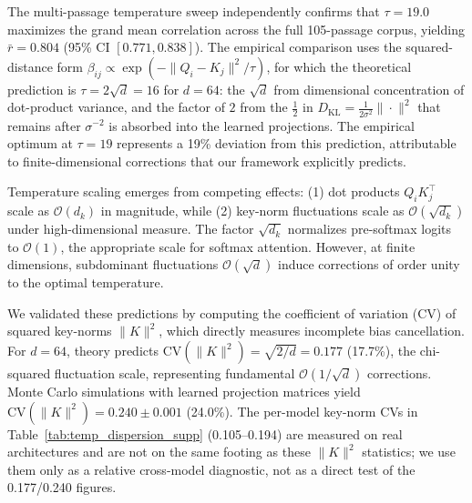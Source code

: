 \documentclass[twoside,11pt]{article}
\begin{document}
The multi-passage temperature sweep independently confirms that $\tau = 19.0$ maximizes the grand mean correlation across the full 105-passage corpus, yielding $\bar{r} = 0.804$ (95\% CI $[0.771, 0.838]$). The empirical comparison uses the squared-distance form $\beta_{ij} \propto \exp(-\|Q_i - K_j\|^2/\tau)$, for which the theoretical prediction is $\tau = 2\sqrt{d} = 16$ for $d = 64$: the $\sqrt{d}$ from dimensional concentration of dot-product variance, and the factor of $2$ from the $\frac{1}{2}$ in $D_{\mathrm{KL}} = \frac{1}{2\sigma^2}\|\cdot\|^2$ that remains after $\sigma^{-2}$ is absorbed into the learned projections. The empirical optimum at $\tau = 19$ represents a 19\% deviation from this prediction, attributable to finite-dimensional corrections that our framework explicitly predicts.

Temperature scaling emerges from competing effects: (1) dot products $Q_i K_j^\top$ scale as $\mathcal{O}(d_k)$ in magnitude, while (2) key-norm fluctuations scale as $\mathcal{O}(\sqrt{d_k})$ under high-dimensional measure. The factor $\sqrt{d_k}$ normalizes pre-softmax logits to $\mathcal{O}(1)$, the appropriate scale for softmax attention. However, at finite dimensions, subdominant fluctuations $\mathcal{O}(\sqrt{d})$ induce corrections of order unity to the optimal temperature.

We validated these predictions by computing the coefficient of variation (CV) of squared key-norms $\|K\|^2$, which directly measures incomplete bias cancellation. For $d = 64$, theory predicts $\text{CV}(\|K\|^2) = \sqrt{2/d} = 0.177$ (17.7\%), the chi-squared fluctuation scale, representing fundamental $\mathcal{O}(1/\sqrt{d})$ corrections. Monte Carlo simulations with learned projection matrices yield $\text{CV}(\|K\|^2) = 0.240 \pm 0.001$ (24.0\%). The per-model key-norm CVs in Table~\ref{tab:temp_dispersion_supp} (0.105--0.194) are measured on real architectures and are not on the same footing as these $\|K\|^2$ statistics; we use them only as a relative cross-model diagnostic, not as a direct test of the 0.177/0.240 figures.
\end{document}
